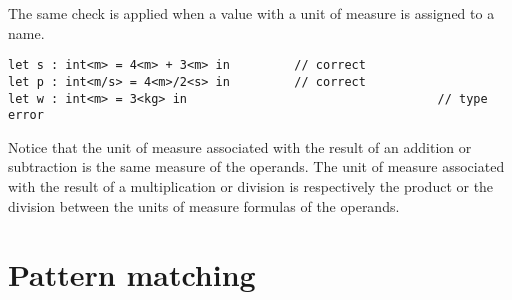 \documentclass[]{article}
\begin{document}
		The same check is applied when a value with a unit of measure is assigned to a name.
		\begin{lstlisting}[caption={Units of measure with bindings}, label=UOMBind]
let s : int<m> = 4<m> + 3<m> in			// correct
let p : int<m/s> = 4<m>/2<s> in			// correct
let w : int<m> = 3<kg> in									// type error
		\end{lstlisting}
		Notice that the unit of measure associated with the result of an addition or subtraction is the same measure of the operands. The unit of measure associated with the result of a multiplication or division is respectively the product or the division between the units of measure formulas of the operands.
		
	\section{Pattern matching}
	
\end{document}
